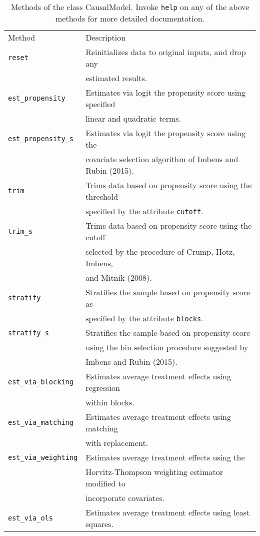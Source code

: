 \documentclass[12pt]{article}
\theoremstyle{definition}
\theoremstyle{definition}
\theoremstyle{definition}
\theoremstyle{remark}
\begin{document}
\begin{table}[h]
\begin{center}\begin{tabular}{ll}
Method & Description \\
\texttt{reset} & Reinitializes data to original inputs, and drop any \\
& estimated results. \\
\texttt{est\_propensity} & Estimates via logit the propensity score using specified \\
& linear and quadratic terms. \\
\texttt{est\_propensity\_s} & Estimates via logit the propensity score using the \\
& covariate selection algorithm of Imbens and Rubin (2015). \\
\texttt{trim} & Trims data based on propensity score using the threshold \\
& specified by the attribute \texttt{cutoff}. \\
\texttt{trim\_s} & Trims data based on propensity score using the cutoff \\
& selected by the procedure of Crump, Hotz, Imbens, \\
& and Mitnik (2008). \\
\texttt{stratify} & Stratifies the sample based on propensity score as \\
& specified by the attribute \texttt{blocks}. \\
\texttt{stratify\_s} & Stratifies the sample based on propensity score \\
& using the bin selection procedure suggested by \\
& Imbens and Rubin (2015). \\
\texttt{est\_via\_blocking} & Estimates average treatment effects using regression \\
& within blocks. \\
\texttt{est\_via\_matching} & Estimates average treatment effects using matching \\
& with replacement. \\
\texttt{est\_via\_weighting} & Estimates average treatment effects using the \\
& Horvitz-Thompson weighting estimator modified to \\
& incorporate covariates. \\
\texttt{est\_via\_ols} & Estimates average treatment effects using least squares.
\end{tabular}\end{center}
\caption{Methods of the class CausalModel. Invoke \texttt{help} on any of the above methods for more detailed documentation.}  \label{tab.b}
\end{table}
\end{document}
